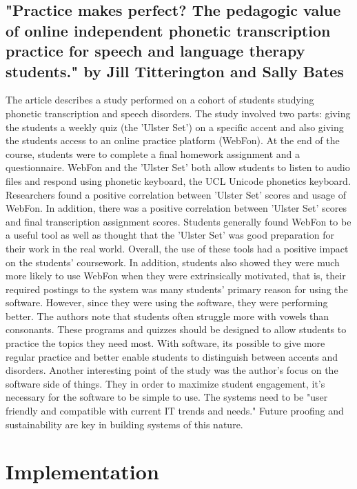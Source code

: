 \documentclass[sigchi]{acmart}
\begin{document}
		\subsection{"Practice makes perfect? The pedagogic value of online independent phonetic transcription practice for speech and language therapy students." by Jill Titterington and Sally Bates}
			The article describes a study performed on a cohort of students studying phonetic transcription and speech disorders. The study involved two parts: giving the students a weekly quiz (the 'Ulster Set') on a specific accent and also giving the students access to an online practice platform (WebFon). At the end of the course, students were to complete a final homework assignment and a questionnaire. WebFon and the 'Ulster Set' both allow students to listen to audio files and respond using phonetic keyboard, the UCL Unicode phonetics keyboard.
			Researchers found a positive correlation between 'Ulster Set' scores and usage of WebFon. In addition, there was a positive correlation between 'Ulster Set' scores and final transcription assignment scores. Students generally found WebFon to be a useful tool as well as thought that the 'Ulster Set' was good preparation for their work in the real world. Overall, the use of these tools had a positive impact on the students' coursework. In addition, students also showed they were much more likely to use WebFon when they were extrinsically motivated, that is, their required postings to the system was many students' primary reason for using the software. However, since they were using the software, they were performing better.
			The authors note that students often struggle more with vowels than consonants. These programs and quizzes should be designed to allow students to practice the topics they need most. With software, its possible to give more regular practice and better enable students to distinguish between accents and disorders.
			Another interesting point of the study was the author's focus on the software side of things. They in order to maximize student engagement, it's necessary for the software to be simple to use. The systems need to be "user friendly and compatible with current IT trends and needs." Future proofing and sustainability are key in building systems of this nature.
	\section{Implementation}
\end{document}
